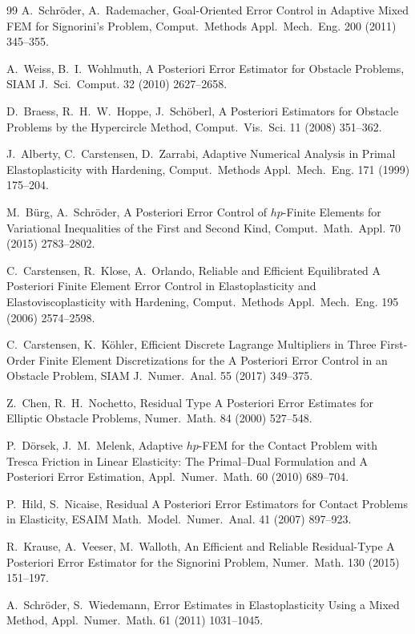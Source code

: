 \documentclass[12pt,twoside,reqno]{amsart}
\theoremstyle{definition}
\numberwithin{equation}{section}
\begin{document}
\begin{thebibliography}{99}
 A.~Schröder, A.~Rademacher, Goal-Oriented Error Control in Adaptive Mixed FEM for Signorini's Problem, Comput.~Methods Appl.~Mech.~Eng. 200 (2011) 345--355.

 A.~Weiss, B.~I.~Wohlmuth, A Posteriori Error Estimator for Obstacle Problems, SIAM J.~Sci.~Comput. 32 (2010) 2627--2658.

 D.~Braess, R.~H.~W.~Hoppe, J.~Schöberl, A Posteriori Estimators for Obstacle Problems by the Hypercircle Method, Comput.~Vis.~Sci. 11 (2008) 351--362.

 J.~Alberty, C.~Carstensen, D.~Zarrabi, Adaptive Numerical Analysis in Primal Elastoplasticity with Hardening, Comput.~Methods Appl.~Mech.~Eng. 171 (1999) 175--204.

 M.~Bürg, A.~Schröder, A Posteriori Error Control of $hp$-Finite Elements for Variational Inequalities of the First and Second Kind, Comput.~Math.~Appl. 70 (2015) 2783--2802.

 C.~Carstensen, R.~Klose, A.~Orlando, Reliable and Efficient Equilibrated A Posteriori Finite Element Error Control in Elastoplasticity and Elastoviscoplasticity with Hardening, Comput.~Methods Appl.~Mech.~Eng. 195 (2006) 2574--2598.

 C.~Carstensen, K.~Köhler, Efficient Discrete Lagrange Multipliers in Three First-Order Finite Element Discretizations for the A Posteriori Error Control in an Obstacle Problem, SIAM J.~Numer.~Anal. 55 (2017) 349--375.

 Z.~Chen, R.~H.~Nochetto, Residual Type A Posteriori Error Estimates for Elliptic Obstacle Problems, Numer.~Math. 84 (2000) 527--548.

 P.~Dörsek, J.~M.~Melenk, Adaptive $hp$-FEM for the Contact Problem with Tresca Friction in Linear Elasticity: The Primal--Dual Formulation and A Posteriori Error Estimation, Appl.~Numer.~Math. 60 (2010) 689--704.

 P.~Hild, S.~Nicaise, Residual A Posteriori Error Estimators for Contact Problems in Elasticity, ESAIM Math.~Model.~Numer.~Anal. 41 (2007) 897--923.

 R.~Krause, A.~Veeser, M.~Walloth, An Efficient and Reliable Residual-Type A Posteriori Error Estimator for the Signorini Problem, Numer.~Math. 130 (2015) 151--197.

 A.~Schröder, S.~Wiedemann, Error Estimates in Elastoplasticity Using a Mixed Method, Appl.~Numer.~Math. 61 (2011) 1031--1045.


\end{thebibliography}
\end{document}
